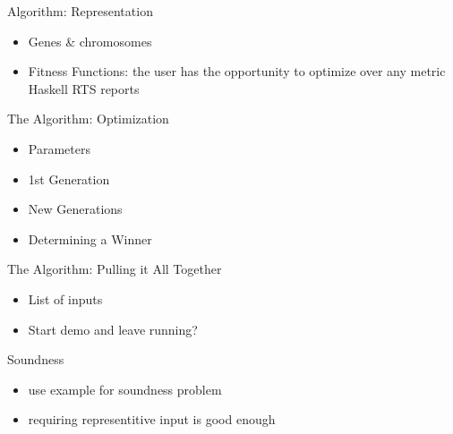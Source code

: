 \documentclass{beamer}
\newcommand{\cut}[1]{}
\begin{document}
\begin{frame}{Algorithm: Representation}
  \begin{itemize}
  \item Genes \& chromosomes
  \item Fitness Functions: the user has the opportunity to optimize over any 
                            metric Haskell RTS reports
  \end{itemize}
\end{frame}

\begin{frame}{The Algorithm: Optimization}
  \begin{itemize}
  \item Parameters
  \item 1st Generation
  \item New Generations
  \item Determining a Winner
  \end{itemize}
\end{frame}

\begin{frame}{The Algorithm: Pulling it All Together}
  \begin{itemize}
  \item List of inputs
  \item Start demo and leave running?
  \end{itemize}
\end{frame}

\cut{
\begin{frame}{The Algorithm: Discussion}
  \begin{itemize}
  \item seq, strict app etc. 
  \end{itemize}
\end{frame}
}

\begin{frame}{Soundness}
  \begin{itemize}
  \item use example for soundness problem
  \item requiring representitive input is good enough
  \end{itemize}
\end{frame}

\cut{
\begin{frame}{Evaluation}
  \begin{itemize}
  \item Introduce benchmarks / setup
  \end{itemize}
\end{frame}
}
\end{document}
